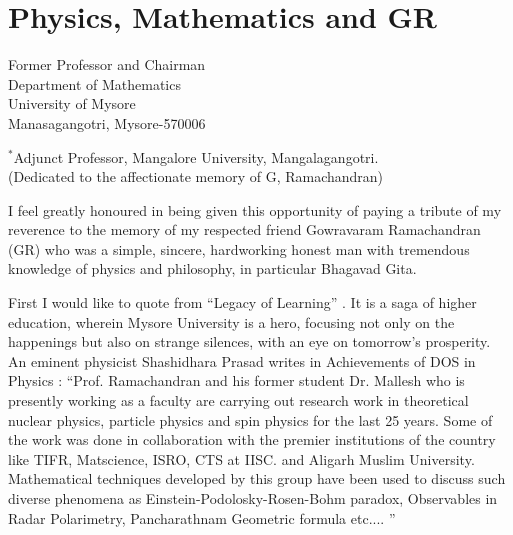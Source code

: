 \chapter{Physics, Mathematics and GR}\label{chap13}


\begin{center}
Former Professor and Chairman\\
Department of Mathematics\\
University of Mysore\\
Manasagangotri, Mysore-570006\\
\end{center}
\begin{center}
$^{*}$Adjunct Professor, Mangalore University, Mangalagangotri.\\
 (Dedicated to the affectionate memory of G, Ramachandran)
\end{center}

I feel greatly honoured in being given this opportunity of paying a tribute of my reverence to the memory of my respected friend Gowravaram Ramachandran (GR) who was a simple, sincere, hardworking honest man with tremendous knowledge of physics and philosophy, in particular Bhagavad Gita.

First I would like to quote from “Legacy of Learning” \cite{chap13-key01BSK}. It is a saga of higher education, wherein Mysore University is a hero, focusing not only on the happenings but also on strange silences, with an eye on tomorrow's prosperity. An eminent physicist Shashidhara Prasad writes in Achievements of DOS in Physics \cite{chap13-key02BSK}: “Prof. Ramachandran and his former student Dr. Mallesh who is presently working as a faculty are carrying out research work in theoretical nuclear physics, particle physics and spin physics for the last 25 years. Some of the work was done in collaboration with the premier institutions of the country like TIFR, Matscience, ISRO, CTS at IISC. and Aligarh Muslim University. Mathematical techniques developed by this group have been used to discuss such diverse phenomena as Einstein-Podolosky-Rosen-Bohm paradox, Observables in Radar Polarimetry, Pancharathnam Geometric formula etc.... ”

